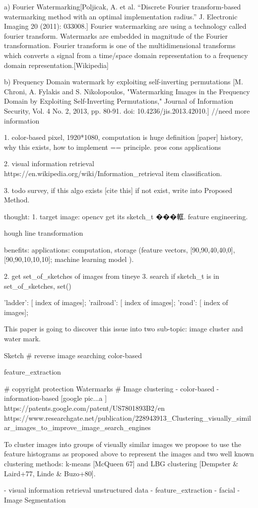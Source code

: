 a) Fourier Watermarking[Poljicak, A. et al. “Discrete Fourier transform-based watermarking method with an optimal implementation radius.” J. Electronic Imaging 20 (2011): 033008.]
Fourier watermarking are using a technology called fourier transform.
Watermarks are embedded in magnitude of the Fourier transformation.
Fourier transform is one of the multidimensional transforms which converts a signal from a time/space domain representation to a frequency domain representation.[Wikipedia]



b) Frequency Domain watermark by exploiting self-inverting permutations
[M. Chroni, A. Fylakis and S. Nikolopoulos, "Watermarking Images in the Frequency Domain by Exploiting Self-Inverting Permutations," Journal of Information Security, Vol. 4 No. 2, 2013, pp. 80-91. doi: 10.4236/jis.2013.42010.]
//need more information

1. color-based pixel, 1920*1080, computation is huge
definition [paper] \cite{}
history, why this exists, 
how to implement == principle.
pros cons
applications

2. visual information retrieval
https://en.wikipedia.org/wiki/Information_retrieval
item classification.


3. todo survey, if this algo exists [cite this]
if not exist, write into Proposed Method.

thought:
1. target image: opencv get its sketch_t ���軭.  feature engineering.

hough line transformation

benefits:
applications:
computation, storage (feature vectors, [90,90,40,40,0], [90,90,10,10,10];
        machine learning model ).

2. get set_of_sketches of images from tineye
3. search if sketch_t is in set_of_sketches, set()

{
'ladder': [ index of images];
'railroad': [ index of images];
'road': [ index of images];
}

This paper is going to discover this issue into two sub-topic: image cluster and water mark.

Sketch
# reverse image searching
    color-based

    feature_extraction   

# copyright protection
    Watermarks  
# Image clustering
    - color-based
    - information-based [google pic...a ]
    https://patents.google.com/patent/US7801893B2/en  
    https://www.researchgate.net/publication/228943913_Clustering_visually_similar_images_to_improve_image_search_engines  {

To cluster images into groups of visually similar images we propose to use the feature histograms as proposed above to represent the images and two well known clustering methods: k-means [McQueen 67] and LBG clustering [Dempster & Laird+77, Linde & Buzo+80]. 
    }
        - visual information retrieval
         unstructured data
        - feature_extraction   
        - facial 
        - Image Segmentation  

